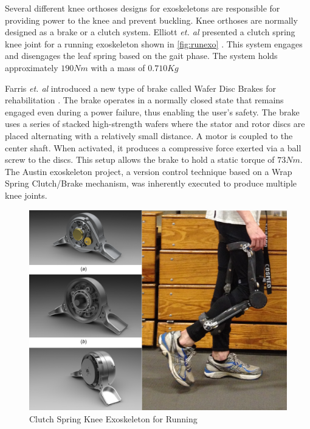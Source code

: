 Several different knee orthoses designs for exoskeletons are responsible for providing power to the knee and prevent buckling.  Knee orthoses are normally designed as a brake or a clutch system. Elliott \textit{et. al} presented a clutch spring knee joint for a running exoskeleton shown in \autoref{fig:runexo} \cite{elliott2014design}. This system engages and disengages the leaf spring based on the gait phase. The system holds approximately $190Nm$ with a mass of $0.710Kg$

Farris \textit{et. al} introduced a new type of brake called Wafer Disc Brakes for rehabilitation \cite{farris2009design}. The brake operates in a normally closed state that remains engaged even during a power failure, thus enabling the user's safety. The brake uses a series of stacked high-strength wafers where the stator and rotor discs are placed alternating with a relatively small distance. A motor is coupled to the center shaft. When activated, it produces a compressive force exerted via a ball screw to the discs. This setup allows the brake to hold a static torque of $73Nm$. The Austin exoskeleton project, a version control technique based on a Wrap Spring Clutch/Brake mechanism, was inherently executed to produce multiple knee joints.
 
 
 \begin{figure}[h]
    \centering
    \includegraphics[scale=0.30, frame]{images/background/clutch.png}
    \caption[Clutch Spring Knee]{Clutch Spring Knee Exoskeleton for Running \cite{elliott2014design}}
    \label{fig:runexo}
\end{figure} 


